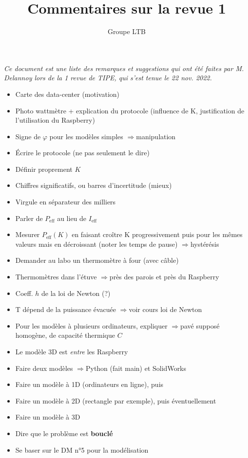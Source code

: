 \documentclass{article}
\title{Commentaires sur la revue 1}
\author{Groupe LTB}
\newcommand*{\eff}{_\text{eff}}
\newcommand{\fleche}{$\Rightarrow {}$}
\begin{document}
\maketitle

\textit{Ce document est une liste des remarques et suggestions qui ont été faites par M. Delannoy lors de la 1 revue de TIPE, qui s'est tenue le 22 nov. 2022.}

\vspace{1cm}

\begin{itemize}
    \item Carte des data-center (motivation)
    \item Photo wattmètre + explication du protocole (influence de K, justification de l'utilisation du Raspberry)
    \item Signe de $\varphi$ pour les modèles simples \fleche manipulation
    \item Écrire le protocole (ne pas seulement le dire)
    \item Définir proprement $K$
    \item Chiffres significatifs, ou barres d'incertitude (mieux)
    \item Virgule en séparateur des milliers
    \item Parler de $P\eff$ au lieu de $I\eff$
    \item Mesurer $P\eff(K)$ en faisant croître K progressivement puis pour les mêmes valeurs mais en décroissant (noter les temps de pause) \fleche hystérésis
    \item Demander au labo un thermomètre à four (avec câble)
    \item Thermomètres dans l'étuve \fleche près des parois et près du Raspberry
    \item Coeff. $h$ de la loi de Newton (?)
    \item T dépend de la puissance évacuée \fleche voir cours loi de Newton
    \item Pour les modèles à plusieurs ordinateurs, expliquer \fleche pavé supposé homogène, de capacité thermique $C$
    \item Le modèle 3D est \textit{entre} les Raspberry
    \item Faire deux modèles \fleche Python (fait main) et SolidWorks
    \item Faire un modèle à 1D (ordinateurs en ligne), puis
    \item Faire un modèle à 2D (rectangle par exemple), puis éventuellement
    \item Faire un modèle à 3D
    \item Dire que le problème est \textbf{bouclé}
    \item Se baser sur le DM n°5 pour la modélisation
\end{itemize}
\end{document}
